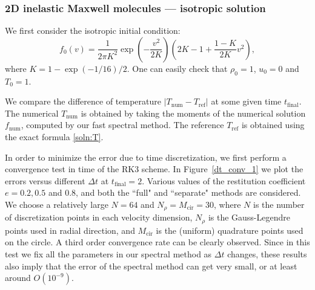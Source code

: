 \documentclass[review,times]{elsarticle}
\begin{document}
\subsubsection{2D inelastic Maxwell molecules --- isotropic solution}

We first consider the isotropic initial condition:
\begin{equation} \label{ext1}
  f_0(v) = \frac{1}{2\pi K^2}\exp\left(-\frac{v^2}{2K}\right)\left(2K-1+\frac{1-K}{2K}v^2\right),
\end{equation}
where $K=1-\exp(-1/16)/2$. One can easily check that $\rho_0 = 1$, $u_0 = 0$ and $T_0 =1$.

We compare the difference of temperature $|T_\text{num} - T_\text{ref}|$ at some given time $t_\text{final}$. The numerical $T_\text{num}$ is obtained by taking the moments of the numerical solution $f_\text{num}$, computed by our fast spectral method. The reference $T_\text{ref}$ is obtained using the exact formula \eqref{soln:T}. 

In order to minimize the error due to time discretization, we first perform a convergence test in time of the RK3 scheme. In Figure~\ref{dt_conv_1} we plot the errors versus different $\Delta t$ at $t_\text{final}=2$. Various values of the restitution coefficient $e = 0.2, 0.5$ and $0.8$, and both the ``full" and ``separate" methods are considered. We choose a relatively large $N=64$ and $N_{\rho}=M_{\text{cir}}=30$, where $N$ is the number of discretization points in each velocity dimension, $N_{\rho}$ is the Gauss-Legendre points used in radial direction, and $M_{\text{cir}}$ is the (uniform) quadrature points used on the circle. A third order convergence rate can be clearly observed. Since in this test we fix all the parameters in our spectral method as $\Delta t$ changes, these results also imply that the error of the spectral method can get very small, or at least around $O(10^{-9})$.
\end{document}
